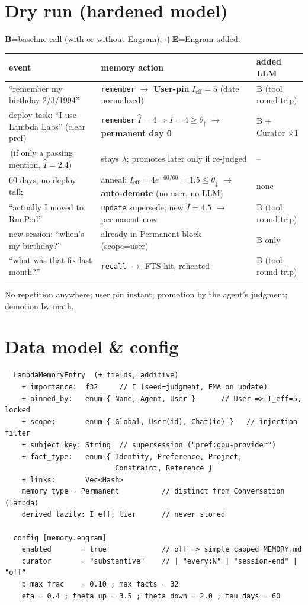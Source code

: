\documentclass[11pt]{article}
\begin{document}
\section{Dry run (hardened model)}
\textbf{B}=baseline call (with or without Engram); \textbf{+E}=Engram-added.
\begin{center}\small
\begin{tabular}{@{}p{5.7cm} p{4.7cm} p{3.6cm}@{}}
\toprule
event & memory action & added LLM\\
\midrule
``remember my birthday 2/3/1994'' & \texttt{remember} $\to$ \textbf{User-pin} $I_{\text{eff}}{=}5$ (date normalized) & B (tool round-trip)\\
deploy task; ``I use Lambda Labs'' (clear pref) & \texttt{remember} $\hat I{=}4 \Rightarrow I{=}4\ge\theta_\uparrow$ $\to$ \textbf{permanent day 0} & B + Curator $\times1$\\
\,(if only a passing mention, $\hat I{=}2.4$) & stays $\lambda$; promotes later only if re-judged & --\\
60 days, no deploy talk & anneal: $I_{\text{eff}}{=}4e^{-60/60}{=}1.5\le\theta_\downarrow$ $\to$ \textbf{auto-demote} (no user, no LLM) & none\\
``actually I moved to RunPod'' & \texttt{update} supersede; new $\hat I{=}4.5$ $\to$ permanent now & B (tool round-trip)\\
new session: ``when's my birthday?'' & already in Permanent block (scope=user) & B only\\
``what was that fix last month?'' & \texttt{recall} $\to$ FTS hit, reheated & B (tool round-trip)\\
\bottomrule
\end{tabular}
\end{center}
No repetition anywhere; user pin instant; promotion by the agent's judgment; demotion by math.

\section{Data model \& config}
\begin{verbatim}
  LambdaMemoryEntry  (+ fields, additive)
    + importance:  f32     // I (seed=judgment, EMA on update)
    + pinned_by:   enum { None, Agent, User }      // User => I_eff=5, locked
    + scope:       enum { Global, User(id), Chat(id) }   // injection filter
    + subject_key: String  // supersession ("pref:gpu-provider")
    + fact_type:   enum { Identity, Preference, Project,
                          Constraint, Reference }
    + links:       Vec<Hash>
    memory_type = Permanent          // distinct from Conversation (lambda)
    derived lazily: I_eff, tier      // never stored

  config [memory.engram]
    enabled       = true             // off => simple capped MEMORY.md
    curator       = "substantive"    // | "every:N" | "session-end" | "off"
    p_max_frac    = 0.10 ; max_facts = 32
    eta = 0.4 ; theta_up = 3.5 ; theta_down = 2.0 ; tau_days = 60
\end{verbatim}
\end{document}
